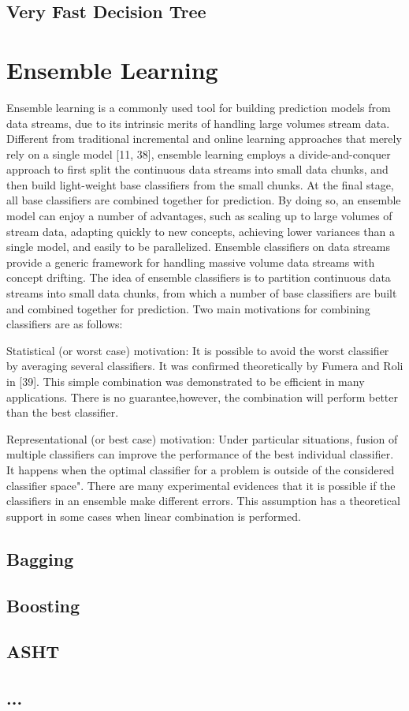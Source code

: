 \documentclass[a4paper, 11pt, oneside]{book}
\begin{document}
\subsection{Very Fast Decision Tree}

\section{Ensemble Learning}
Ensemble learning is a commonly used tool for building prediction models from data streams, due to
its intrinsic merits of handling large volumes stream data. Different from traditional incremental and
online learning approaches that merely rely on a single model [11, 38], ensemble learning employs a
divide-and-conquer approach to first split the continuous data streams into small data chunks, and
then build light-weight base classifiers from the small chunks. At the final stage, all base classifiers are
combined together for prediction. By doing so, an ensemble model can enjoy a number of advantages,
such as scaling up to large volumes of stream data, adapting quickly to new concepts, achieving lower
variances than a single model, and easily to be parallelized.
Ensemble classifiers on data streams provide a generic framework for handling massive volume data
streams with concept drifting. The idea of ensemble classifiers is to partition continuous data streams
into small data chunks, from which a number of base classifiers are built and combined together for
prediction. Two main motivations for combining classifiers are as follows:

Statistical (or worst case) motivation: It is possible to avoid the worst classifier by averaging
several classifiers. It was confirmed theoretically by Fumera and Roli in [39]. This simple
combination was demonstrated to be efficient in many applications. There is no guarantee,however, the combination will perform better than the best classifier.

Representational (or best case) motivation: Under particular situations, fusion of multiple
classifiers can improve the performance of the best individual classifier. It happens when the
optimal classifier for a problem is outside of the considered classifier space". There are many
experimental evidences that it is possible if the classifiers in an ensemble make different errors.
This assumption has a theoretical support in some cases when linear combination is performed.



\subsection{Bagging}
\subsection{Boosting}
\subsection{ASHT}
\subsection{...}



\end{document}
